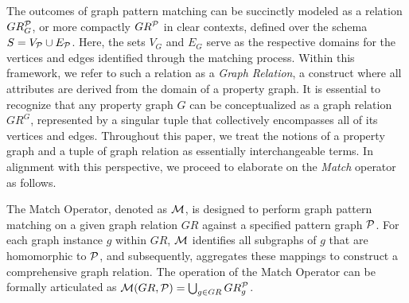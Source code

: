 The outcomes of graph pattern matching can be succinctly modeled as a relation \(GR_G^{\mathcal{P}}\), or more compactly \(GR^{\mathcal{P}}\) in clear contexts, defined over the schema \(S = V_{\mathcal{P}} \cup E_{\mathcal{P}}\). Here, the sets \(V_G\) and \(E_G\) serve as the respective domains for the vertices and edges identified through the matching process. Within this framework, we refer to such a relation as a \emph{Graph Relation}, a construct where all attributes are derived from the domain of a property graph.
It is essential to recognize that any property graph \(G\) can be conceptualized as a graph relation \(GR^G\), represented by a singular tuple that collectively encompasses all of its vertices and edges. Throughout this paper, we treat the notions of a property graph and a tuple of graph relation as essentially interchangeable terms. In alignment with this perspective, we proceed to elaborate on the \emph{Match} operator as follows.



\begin{definition}
    \label{def:match}
    The Match Operator, denoted as \(\mathcal{M}\), is designed to perform graph pattern matching on a given graph relation \(GR\) against a specified pattern graph \(\mathcal{P}\). For each graph instance \(g\) within \(GR\), \(\mathcal{M}\) identifies all subgraphs of \(g\) that are homomorphic to \(\mathcal{P}\), and subsequently, aggregates these mappings to construct a comprehensive graph relation. The operation of the Match Operator can be formally articulated as \(\mathcal{M}(GR, \mathcal{P}) = \bigcup_{g \in GR} GR_g^{\mathcal{P}}\).%
\end{definition}

